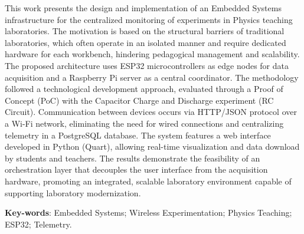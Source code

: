
This work presents the design and implementation of an Embedded Systems infrastructure for the centralized monitoring of experiments in Physics teaching laboratories. The motivation is based on the structural barriers of traditional laboratories, which often operate in an isolated manner and require dedicated hardware for each workbench, hindering pedagogical management and scalability. The proposed architecture uses ESP32 microcontrollers as edge nodes for data acquisition and a Raspberry Pi server as a central coordinator. The methodology followed a technological development approach, evaluated through a Proof of Concept (PoC) with the Capacitor Charge and Discharge experiment (RC Circuit). Communication between devices occurs via HTTP/JSON protocol over a Wi-Fi network, eliminating the need for wired connections and centralizing telemetry in a PostgreSQL database. The system features a web interface developed in Python (Quart), allowing real-time visualization and data download by students and teachers. The results demonstrate the feasibility of an orchestration layer that decouples the user interface from the acquisition hardware, promoting an integrated, scalable laboratory environment capable of supporting laboratory modernization.

\textbf{Key-words}: Embedded Systems; Wireless Experimentation; Physics Teaching; ESP32; Telemetry.
